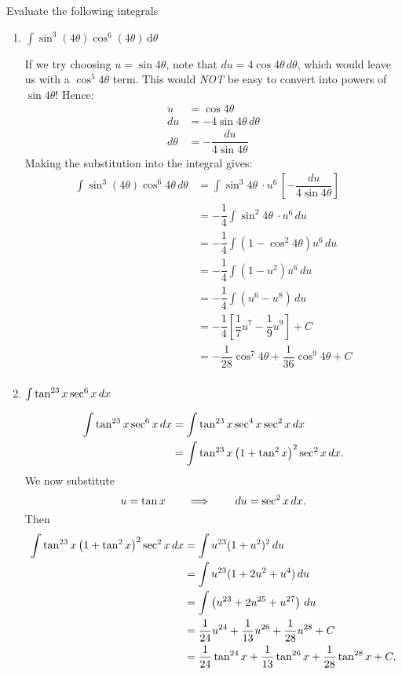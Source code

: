 \documentclass[noinstructornotes]{ximera}
\begin{document}
\begin{problem}
Evaluate the following integrals
	\begin{enumerate}
	\item  $\displaystyle\int \sin^3 (4 \theta) \cos^6 (4\theta) \, \mathrm{d}\theta$
	\begin{freeResponse}
	If we try choosing $u=\sin 4\theta$, note that $du = 4\cos 4\theta \, d\theta$, which would leave us with a $\cos^5 4\theta$ term.  This would \emph{NOT} be easy to convert into powers of $\sin 4\theta$!  Hence: \color{red}
\begin{align*}
u & = \cos 4 \theta \\
du & = - 4 \sin 4 \theta \,d\theta \\
d\theta &= -\dfrac{du}{4 \sin 4 \theta} 
\end{align*}
\color{black}
Making the substitution into the integral gives:
\begin{align*}
\int \sin^3 (4 \theta) \cos^6 4\theta \, d\theta & = \int \sin^3 4 \theta ~ \cdot u^6 \, \left[ -\dfrac{du}{4 \sin 4 \theta} \right ] \\
&= -\dfrac{1}{4} \int \sin^2 4 \theta  ~ \cdot u^6 \, du  \\
&= -\dfrac{1}{4} \int (1-\cos^2 4 \theta) u^6 \, du  \\
&= -\dfrac{1}{4} \int (1-u^2) u^6 \, du  \\
&= -\dfrac{1}{4} \int (u^6-u^8)  \, du  \\
 &= -\dfrac{1}{4}\left[\dfrac{1}{7} u^7 - \dfrac{1}{9} u^9 \right] + C\\
 &= \boxed{-\dfrac{1}{28} \cos^7 4 \theta + \dfrac{1}{36} \cos^9 4 \theta +C} \\
\end{align*}

	\end{freeResponse}
	\item  $\int \tan^{23} x \sec^6 x \,d x$
	\begin{freeResponse}
		\begin{align*}
		\int \tan^{23} x \sec^6 x \,d x 
		&= \int \tan^{23} x \sec^4 x \sec^2 x \,d x  \\
		&= \int \tan^{23} x \left( 1 + \tan^2 x \right)^2 \sec^2 x \,d x .
		\end{align*}
	We now substitute
		{\color{red}
		\[
		u = \tan x 	\qquad	\Longrightarrow		\qquad	\,d u = \sec^2 x \,d x.
		\]
		}
	Then
		\begin{align*}
		\int \tan^{23} x \left( 1 + \tan^2 x \right)^2 \sec^2 x \,d x
		&= \int u^{23} (1+u^2)^2 \,d u  \\
		&= \int u^{23} (1 + 2u^2 + u^4) \,d u  \\
		&= \int \left( u^{23} + 2u^{25} + u^{27} \right) \,d u  \\
		&= \frac{1}{24} u^{24} + \frac{1}{13} u^{26} + \frac{1}{28} u^{28} + C  \\
		&= \frac{1}{24} \tan^{24} x + \frac{1}{13} \tan^{26} x + \frac{1}{28} \tan^{28} x + C.
		\end{align*}
	\end{freeResponse}
	

\end{enumerate}
\end{problem}
\end{document}
